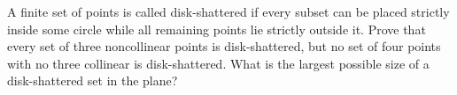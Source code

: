 A finite set of points is called disk-shattered if every subset can be placed strictly inside some circle while all remaining points lie strictly outside it. Prove that every set of three noncollinear points is disk-shattered, but no set of four points with no three collinear is disk-shattered. What is the largest possible size of a disk-shattered set in the plane?
